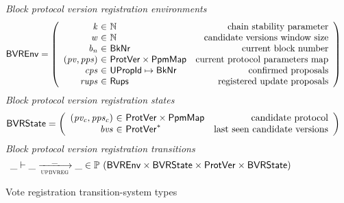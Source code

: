 \begin{figure}[htb]
  \emph{Block protocol version registration environments}
  \begin{align*}
    & \BVREnv
      = \left(
      \begin{array}{r@{~\in~}lr}
        \var{k} & \mathbb{N} & \text{chain stability parameter}\\
        \var{w} & \mathbb{N} & \text{candidate versions window size}\\
        \var{b_n} & \BkNr & \text{current block number}\\
        (\var{pv}, \var{pps}) & \ProtVer \times \PPMMap
                             & \text{current protocol parameters map}\\
        \var{cps} & \UPropId \mapsto \BkNr & \text{confirmed proposals}\\
        \var{rups} & \Rups
                             & \text{registered update proposals}\\
      \end{array}\right)
  \end{align*}
  \emph{Block protocol version registration states}
  \begin{align*}
    & \BVRState
      = \left(
      \begin{array}{r@{~\in~}lr}
        (\var{pv_c}, \var{pps_c}) & \ProtVer \times \PPMMap
        & \text{candidate protocol}\\
        \var{bvs} & \seqof{\ProtVer} & \text{last seen candidate versions}
      \end{array}\right)
  \end{align*}
  \emph{Block protocol version registration transitions}
    \begin{equation*}
    \_ \vdash \_ \trans{upbvreg}{\_} \_ \in
    \powerset (\BVREnv \times \BVRState \times \ProtVer \times \BVRState)
    \end{equation*}
  \caption{Vote registration transition-system types}
  \label{fig:ts-types:up-bv-reg}
\end{figure}

